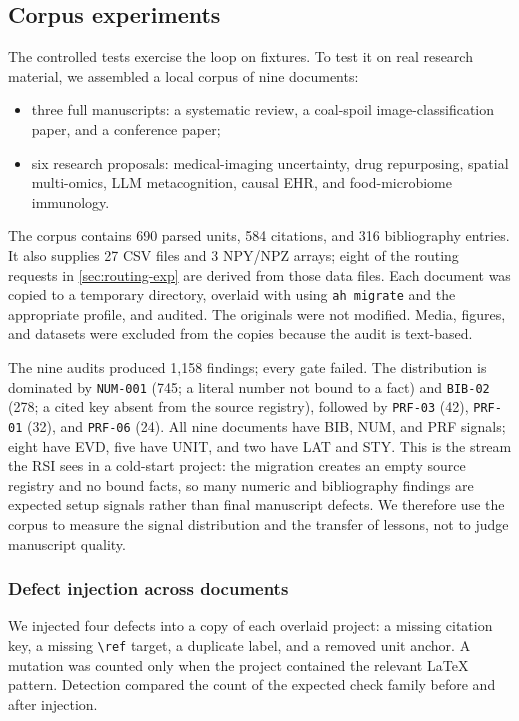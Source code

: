 \subsection{Corpus experiments}
\label{sec:corpus}

The controlled tests exercise the loop on fixtures. To test it on real research material, we assembled a local corpus of nine documents:
\begin{itemize}[leftmargin=1.4em,itemsep=1pt]
  \item three full manuscripts: a systematic review, a coal-spoil image-classification paper, and a conference paper;
  \item six research proposals: medical-imaging uncertainty, drug repurposing, spatial multi-omics, LLM metacognition, causal EHR, and food-microbiome immunology.
\end{itemize}
The corpus contains 690 parsed units, 584 citations, and 316 bibliography entries. It also supplies 27 CSV files and 3 NPY/NPZ arrays; eight of the routing requests in \cref{sec:routing-exp} are derived from those data files. Each document was copied to a temporary directory, overlaid with \ah{} using \texttt{ah migrate} and the appropriate profile, and audited. The originals were not modified. Media, figures, and datasets were excluded from the copies because the audit is text-based.

The nine audits produced 1,158 findings; every gate failed. The distribution is dominated by \texttt{NUM-001} (745; a literal number not bound to a fact) and \texttt{BIB-02} (278; a cited key absent from the source registry), followed by \texttt{PRF-03} (42), \texttt{PRF-01} (32), and \texttt{PRF-06} (24). All nine documents have BIB, NUM, and PRF signals; eight have EVD, five have UNIT, and two have LAT and STY. This is the stream the RSI sees in a cold-start project: the migration creates an empty source registry and no bound facts, so many numeric and bibliography findings are expected setup signals rather than final manuscript defects. We therefore use the corpus to measure the signal distribution and the transfer of lessons, not to judge manuscript quality.

\FloatBarrier


\subsubsection{Defect injection across documents}
\label{sec:defects-exp}
We injected four defects into a copy of each overlaid project: a missing citation key, a missing \verb|\ref| target, a duplicate label, and a removed unit anchor. A mutation was counted only when the project contained the relevant \LaTeX{} pattern. Detection compared the count of the expected check family before and after injection.

